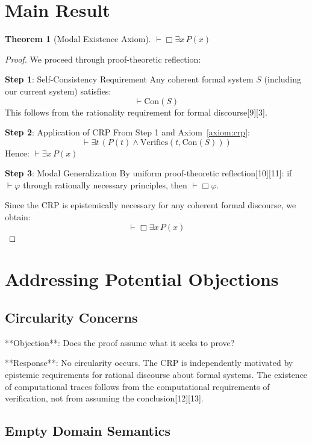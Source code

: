 \documentclass[12pt]{article}
\newtheorem{theorem}{Theorem}
\begin{document}
\section{Main Result}

\begin{theorem}[Modal Existence Axiom]
\label{thm:main}
$\vdash \Box\exists x\,P(x)$
\end{theorem}

\begin{proof}
We proceed through proof-theoretic reflection:

\textbf{Step 1}: Self-Consistency Requirement
Any coherent formal system $S$ (including our current system) satisfies:
$$
\vdash \text{Con}(S)
$$
This follows from the rationality requirement for formal discourse[9][3].

\textbf{Step 2}: Application of CRP
From Step 1 and Axiom~\ref{axiom:crp}:
$$
\vdash \exists t\,(P(t) \wedge \text{Verifies}(t, \text{Con}(S)))
$$
Hence: $\vdash \exists x\,P(x)$

\textbf{Step 3}: Modal Generalization  
By uniform proof-theoretic reflection[10][11]: if $\vdash \varphi$ through rationally necessary principles, then $\vdash \Box\varphi$.

Since the CRP is epistemically necessary for any coherent formal discourse, we obtain:
$$
\vdash \Box\exists x\,P(x)
$$
\end{proof}

\section{Addressing Potential Objections}

\subsection{Circularity Concerns}

**Objection**: Does the proof assume what it seeks to prove?

**Response**: No circularity occurs. The CRP is independently motivated by epistemic requirements for rational discourse about formal systems. The existence of computational traces follows from the computational requirements of verification, not from assuming the conclusion[12][13].

\subsection{Empty Domain Semantics}
\end{document}
